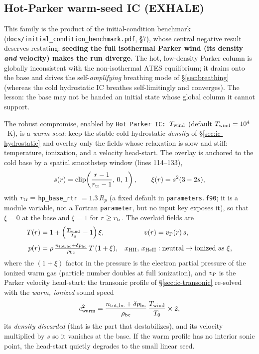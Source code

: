 \documentclass[english,a4paper]{my_memo}
\begin{document}
\subsection{Hot-Parker warm-seed IC (EXHALE)}
\label{sec:ic-hotparker}

This family is the product of the initial-condition benchmark
(\texttt{docs/initial\_condition\_benchmark.pdf}, \S7), whose central
negative result deserves restating: \textbf{seeding the full
isothermal Parker wind (its density \emph{and} velocity) makes
the run diverge.} The hot, low-density Parker column is globally
inconsistent with the non-isothermal ATES equilibrium; it drains onto
the base and drives the self-\emph{amplifying} breathing mode of
\S\ref{sec:breathing} (whereas the cold hydrostatic IC breathes
self-limitingly and converges). The lesson: the base may not be handed
an initial state whose global column it cannot support.

The robust compromise, enabled by
\texttt{Hot Parker IC: $T_{\rm wind}$} (default
$T_{\rm wind} = 10^4$~K), is a \emph{warm seed}: keep the stable cold
hydrostatic \emph{density} of \S\ref{sec:ic-hydrostatic} and overlay
only the fields whose relaxation is slow and stiff: temperature,
ionization, and a velocity head-start. The overlay is anchored to the
cold base by a spatial smoothstep window (lines 114--133),
\begin{equation}
s(r) = \mathrm{clip}\!\left(\frac{r - 1}{r_{\rm tr} - 1},\, 0,\, 1\right),
\qquad
\xi(r) = s^2 (3 - 2s),
\end{equation}
with $r_{\rm tr} = $ \texttt{hp\_base\_rtr} $= 1.3\,R_p$ (a fixed default
in \texttt{parameters.f90}; it is a module variable, not a Fortran
\texttt{parameter}, but no input key exposes it), so that $\xi = 0$
at the base and $\xi = 1$ for $r \ge r_{\rm tr}$. The overlaid fields
are
\begin{align}
T(r)   &= 1 + \left(\tfrac{T_{\rm wind}}{T_0} - 1\right)\xi, &
v(r)   &= v_{\rm P}(r)\, s, \nonumber\\[2pt]
p(r)   &= \rho\,\tfrac{n_{\rm tot,bc}+\delta p_{\rm bc}}{\rho_{\rm bc}}\,
          T\,(1 + \xi), &
x_{\rm HII},\, x_{\rm HeII} &: \mbox{neutral} \to \mbox{ionized as } \xi,
\end{align}
where the $(1+\xi)$ factor in the pressure is the electron partial
pressure of the ionized warm gas (particle number doubles at full
ionization), and $v_{\rm P}$ is the Parker velocity head-start: the
transonic profile of \S\ref{sec:ic-transonic} re-solved with the
\emph{warm, ionized} sound speed
\begin{equation}
c^2_{\rm warm}
   = \frac{n_{\rm tot,bc}+\delta p_{\rm bc}}{\rho_{\rm bc}}\,
     \frac{T_{\rm wind}}{T_0}\times 2,
\end{equation}
its \emph{density discarded} (that is the part that destabilizes), and
its velocity multiplied by $s$ so it vanishes at the base. If the warm
profile has no interior sonic point, the head-start quietly degrades
to the small linear seed.
\end{document}
